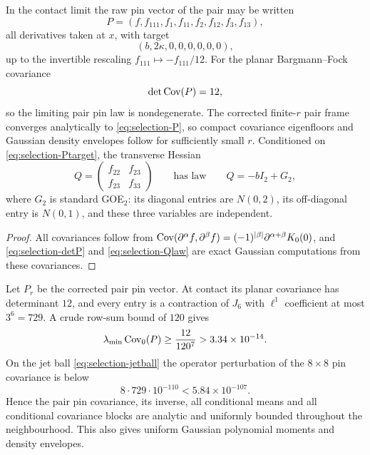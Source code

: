 \begin{lemma}\label{lem:selection-pairlaw}
In the contact limit the raw pin vector of the pair may be written
\begin{equation}\label{eq:selection-P}
P=(f,f_{111},f_1,f_{11},f_2,f_{12},f_3,f_{13}),
\end{equation}
all derivatives taken at $x$, with target
\begin{equation}\label{eq:selection-Ptarget}
(b,2\kappa,0,0,0,0,0,0),
\end{equation}
up to the invertible rescaling $f_{111}\mapsto-f_{111}/12$. For the planar Bargmann--Fock covariance
\begin{equation}\label{eq:selection-detP}
\det\operatorname{Cov}(P)=12,
\end{equation}
so the limiting pair pin law is nondegenerate. The corrected finite-$r$ pair frame converges analytically to \eqref{eq:selection-P}, so compact covariance eigenfloors and Gaussian density envelopes follow for sufficiently small $r$. Conditioned on \eqref{eq:selection-Ptarget}, the transverse Hessian
\begin{equation}\label{eq:selection-Qlaw}
Q=\begin{pmatrix}f_{22}&f_{23}\\f_{23}&f_{33}\end{pmatrix}\qquad\text{has law}\qquad Q=-bI_2+G_2,
\end{equation}
where $G_2$ is standard GOE$_2$: its diagonal entries are $N(0,2)$, its off-diagonal entry is $N(0,1)$, and these three variables are independent.
\end{lemma}

\begin{proof}
All covariances follow from $\operatorname{Cov}(\partial^\alpha f,\partial^\beta f)=(-1)^{|\beta|}\partial^{\alpha+\beta}K_0(0)$, and \eqref{eq:selection-detP} and \eqref{eq:selection-Qlaw} are exact Gaussian computations from these covariances.
\end{proof}

\begin{lemma}\label{lem:selection-pinstab}
Let $P_r$ be the corrected pair pin vector. At contact its planar covariance has determinant $12$, and every entry is a contraction of $J_6$ with $\ell^1$ coefficient at most $3^6=729$. A crude row-sum bound of $120$ gives
\begin{equation}\label{eq:selection-pinfloor}
\lambda_{\min}\operatorname{Cov}_0(P)\ge\frac{12}{120^7}>3.34\times10^{-14}.
\end{equation}
On the jet ball \eqref{eq:selection-jetball} the operator perturbation of the $8\times8$ pin covariance is below
\begin{equation}\label{eq:selection-pinpert}
8\cdot729\cdot10^{-110}<5.84\times10^{-107}.
\end{equation}
Hence the pair pin covariance, its inverse, all conditional means and all conditional covariance blocks are analytic and uniformly bounded throughout the neighbourhood. This also gives uniform Gaussian polynomial moments and density envelopes.
\end{lemma}

